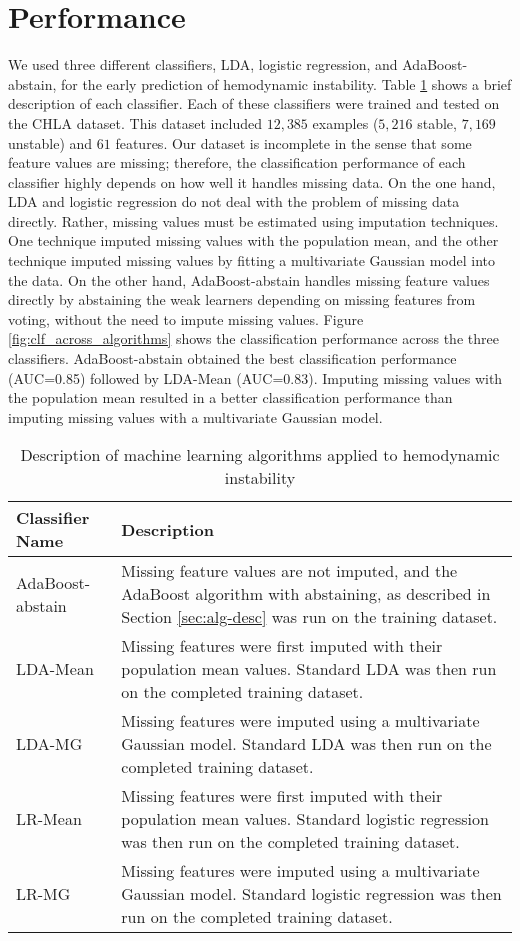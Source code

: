 \documentclass[
   technote
]{phildoc}
\begin{document}
\section{Performance}
We used three different classifiers, LDA, logistic regression, and AdaBoost-abstain, for the early prediction of hemodynamic instability. Table \ref{tab:clf_description} shows a brief description of each classifier. Each of these classifiers were trained and tested on the CHLA dataset. This dataset included $12,385$ examples ($5,216$ stable, $7,169$ unstable) and $61$ features. Our dataset is incomplete in the sense that some feature values are missing; therefore, the classification performance of each classifier highly depends on how well it handles missing data. On the one hand, LDA and logistic regression do not deal with the problem of missing data directly. Rather, missing values must be estimated using imputation techniques. One technique imputed missing values with the population mean, and the other technique imputed missing values by fitting a multivariate Gaussian model into the data. On the other hand, AdaBoost-abstain handles missing feature values directly by abstaining the weak learners depending on missing features from voting, without the need to impute missing values. Figure \ref{fig:clf_across_algorithms} shows the classification performance across the three classifiers. AdaBoost-abstain obtained the best classification performance (AUC=0.85) followed by LDA-Mean (AUC=0.83). Imputing missing values with the population mean resulted in a better classification performance than imputing missing values with a multivariate Gaussian model.

\begin{table}[h!]
\centering
\caption{Description of machine learning algorithms applied to hemodynamic instability}
\label{tab:clf_description}       
\begin{tabular}{|p{}p{}|}
\hline
\textbf{Classifier Name} & \textbf{Description} \\
\hline
\hline
AdaBoost-abstain & Missing feature values are not imputed, and the AdaBoost algorithm with abstaining, as described in Section \ref{sec:alg-desc} was run on the training dataset. \\
\hline
LDA-Mean & Missing features were first imputed with their population mean values. Standard LDA was then run on the completed training dataset.\\
\hline
LDA-MG &	Missing features were imputed using a multivariate Gaussian model. Standard LDA was then run on the completed training dataset. \\
\hline
LR-Mean & Missing features were first imputed with their population mean values. Standard logistic regression was then run on the completed training dataset.		\\
\hline
LR-MG & Missing features were imputed using a multivariate Gaussian model. Standard logistic regression was then run on the completed training dataset. \\
\hline
\end{tabular}
\end{table}
\end{document}
